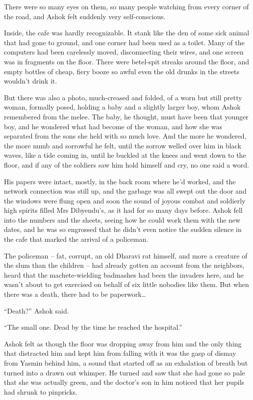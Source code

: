 There were so many eyes on them, so many people watching from every
corner of the road, and Ashok felt suddenly very self-conscious.

Inside, the cafe was hardly recognizable. It stank like the den of
some sick animal that had gone to ground, and one corner had been
used as a toilet. Many of the computers had been carelessly moved,
disconnecting their wires, and one screen was in fragments on the
floor. There were betel-spit streaks around the floor, and empty
bottles of cheap, fiery booze so awful even the old drunks in the
streets wouldn't drink it.

But there was also a photo, much-creased and folded, of a worn but
still pretty woman, formally posed, holding a baby and a slightly
larger boy, whom Ashok remembered from the melee. The baby, he
thought, must have been that younger boy, and he wondered what had
become of the woman, and how she was separated from the sons she
held with so much love. And the more he wondered, the more numb and
sorrowful he felt, until the sorrow welled over him in black waves,
like a tide coming in, until he buckled at the knees and went down
to the floor, and if any of the soldiers saw him hold himself and
cry, no one said a word.

His papers were intact, mostly, in the back room where he'd worked,
and the network connection was still up, and the garbage was all
swept out the door and the windows were flung open and soon the
sound of joyous combat and soldierly high spirits filled Mrs
Dibyendu's, as it had for so many days before. Ashok fell into the
numbers and the sheets, seeing how he could work them with the new
dates, and he was so engrossed that he didn't even notice the
sudden silence in the cafe that marked the arrival of a policeman.

The policeman -- fat, corrupt, an old Dharavi rat himself, and more
a creature of the slum than the children -- had already gotten an
account from the neighbors, heard that the machete-wielding
badmashes had been the invaders here, and he wasn't about to get
exercised on behalf of six little nobodies like them. But when
there was a death, there had to be paperwork\ldots{}

``Death?'' Ashok said.

``The small one. Dead by the time he reached the hospital.''

Ashok felt as though the floor was dropping away from him and the
only thing that distracted him and kept him from falling with it
was the gasp of dismay from Yasmin behind him, a sound that started
off as an exhalation of breath but turned into a drawn out whimper.
He turned and saw that she had gone so pale that she was actually
green, and the doctor's son in him noticed that her pupils had
shrunk to pinpricks.

